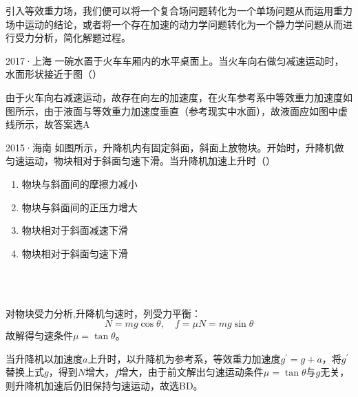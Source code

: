引入等效重力场，我们便可以将一个复合场问题转化为一个单场问题从而运用重力场中运动的结论，或者将一个存在加速的动力学问题转化为一个静力学问题从而进行受力分析，简化解题过程。

\begin{ep}{2017·上海}{}
一碗水置于火车车厢内的水平桌面上。当火车向右做匀减速运动时，水面形状接近于图（）

\begin{minipage}[b]{0.6\linewidth}
由于火车向右减速运动，故存在向左的加速度，在火车参考系中等效重力加速度如图所示，由于液面与等效重力加速度垂直（参考现实中水面），故液面应如图中虚线所示，故答案选A
\end{minipage}
\hfill
\begin{minipage}[b]{0.3\linewidth}

\end{minipage}
\end{ep}

\begin{ep}{2015·海南}{}
如图所示，升降机内有固定斜面，斜面上放物块。开始时，升降机做匀速运动，物块相对于斜面匀速下滑。当升降机加速上升时（）

\begin{minipage}[b]{0.6\linewidth}
\begin{enumerate}[label=(\Alph*)]
  \item 物块与斜面间的摩擦力减小
  \item 物块与斜面间的正压力增大
  \item 物块相对于斜面减速下滑
  \item 物块相对于斜面匀速下滑
\end{enumerate}
\end{minipage}
\hfill
\begin{minipage}[b]{0.3\linewidth}

\end{minipage}
~\\

\begin{minipage}[b]{0.6\linewidth}
~\\

对物块受力分析,升降机匀速时，列受力平衡：
$$N = mg \cos{\theta} ,\quad f=\mu N = mg \sin{\theta}$$
故解得匀速条件$\mu = \tan{\theta}$。

当升降机以加速度$a$上升时，以升降机为参考系，等效重力加速度$g^{\prime}=g+a$，将$g^{\prime}$替换上式$g$，得到$N$增大，$f$增大，由于前文解出匀速运动条件$\mu = \tan{\theta}$与$g$无关，则升降机加速后仍旧保持匀速运动，故选BD。

\end{minipage}
\hfill
\begin{minipage}[b]{0.3\linewidth}

\end{minipage}

\end{ep}
